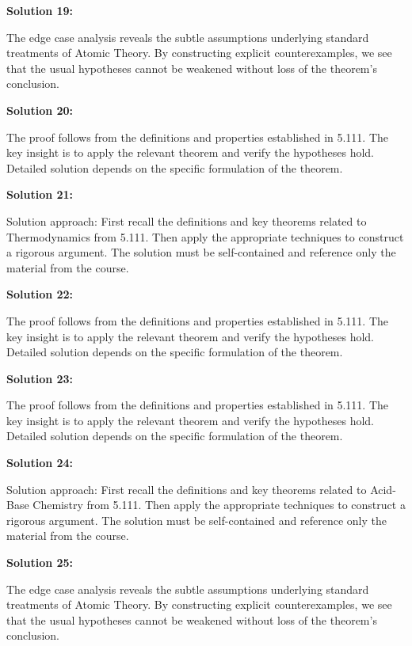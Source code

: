 \documentclass[12pt,a4paper]{exam}
\begin{document}
\vspace{0.5cm}

\textbf{Solution 19:}

The edge case analysis reveals the subtle assumptions underlying standard treatments of Atomic Theory. By constructing explicit counterexamples, we see that the usual hypotheses cannot be weakened without loss of the theorem's conclusion.

\vspace{0.5cm}

\textbf{Solution 20:}

The proof follows from the definitions and properties established in 5.111. The key insight is to apply the relevant theorem and verify the hypotheses hold. Detailed solution depends on the specific formulation of the theorem.

\vspace{0.5cm}

\textbf{Solution 21:}

Solution approach: First recall the definitions and key theorems related to Thermodynamics from 5.111. Then apply the appropriate techniques to construct a rigorous argument. The solution must be self-contained and reference only the material from the course.

\vspace{0.5cm}

\textbf{Solution 22:}

The proof follows from the definitions and properties established in 5.111. The key insight is to apply the relevant theorem and verify the hypotheses hold. Detailed solution depends on the specific formulation of the theorem.

\vspace{0.5cm}

\textbf{Solution 23:}

The proof follows from the definitions and properties established in 5.111. The key insight is to apply the relevant theorem and verify the hypotheses hold. Detailed solution depends on the specific formulation of the theorem.

\vspace{0.5cm}

\textbf{Solution 24:}

Solution approach: First recall the definitions and key theorems related to Acid-Base Chemistry from 5.111. Then apply the appropriate techniques to construct a rigorous argument. The solution must be self-contained and reference only the material from the course.

\vspace{0.5cm}

\textbf{Solution 25:}

The edge case analysis reveals the subtle assumptions underlying standard treatments of Atomic Theory. By constructing explicit counterexamples, we see that the usual hypotheses cannot be weakened without loss of the theorem's conclusion.

\vspace{0.5cm}
\end{document}

